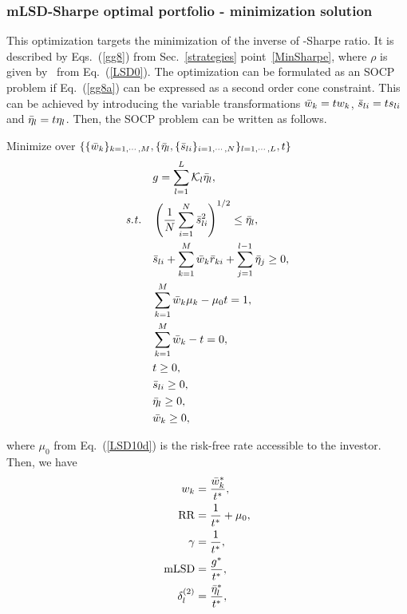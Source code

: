 

\BackToContents


\subsubsection{mLSD-Sharpe optimal portfolio - minimization solution}
This optimization targets the minimization of the inverse of \mLSD-Sharpe ratio.
It is  described by Eqs.~(\ref{gg8}) from Sec.~\ref{strategies} point~\ref{MinSharpe}, where
$\rho$ is given by \mLSD\ from Eq.~(\ref{LSD0}).
The optimization can be formulated as an SOCP problem if  Eq.~(\ref{gg8a}) can be expressed as a second order cone constraint.
This can be achieved by
introducing the variable transformations
${\bar w}_k = t w_k$, ${\bar s}_{li} = t s_{li}$ and ${\bar \eta}_l = t \eta_l$.
Then, the SOCP problem can be written as follows.

\bigskip
\noindent Minimize over $\{ \{{\bar w}_k\}_{k=1,\cdots,M}, \{ {\bar \eta}_l, \{ {\bar s}_{li} \}_{i=1,\cdots,N} \}_{l=1,\cdots,L}, t \}$
\begin{subequations}\label{LSD10}
\begin{align}
    & g = \sum_{l=1}^L \cK_l \bbeta_l, \label{LSD10a} \\
    \st & \left( \frac{1}{N} \sum_{i=1}^N \bs_{li}^2 \right)^{1/2} \leq \bbeta_l, \label{LSD10b} \\
        & \bs_{li} + \sum_{k=1}^M \bw_k\br_{ki} + \sum_{j=1}^{l-1}\bbeta_j \geq 0, \label{LSD10c} \\
        & \sum_{k=1}^M \bw_k \mu_k -\mu_0 t = 1, \label{LSD10d} \\
        & \sum_{k=1}^M \bw_k - t = 0, \label{LSD10e} \\
        & t \geq 0, \label{LSD10f} \\
        & \bs_{li} \geq 0, \label{LSD10g} \\
        & \bbeta_l \geq 0, \label{LSD11h} \\
        & \bw_k \geq 0, \label{LSD10i}
\end{align}
\end{subequations}

\noindent where $\mu_0$ from Eq.~(\ref{LSD10d}) is the risk-free rate accessible to the investor.
Then, we have
\begin{subequations}\label{LSD11}
\begin{align}
    w_k &= \frac{\bw_k^*}{t^*} , \label{LSD11a} \\
    \RR &= \frac{1}{t^*} + \mu_0, \label{LSD11b} \\
    \Sharpe &= \frac{1}{t^*}, \label{LSD11c} \\
    \mLSD &= \frac{g^*}{t^*}, \label{LSD11d} \\
    \delta^{(2)}_l &= \frac{\bbeta_l^*}{t^*}, \label{LSD11e}
\end{align}
\end{subequations}

